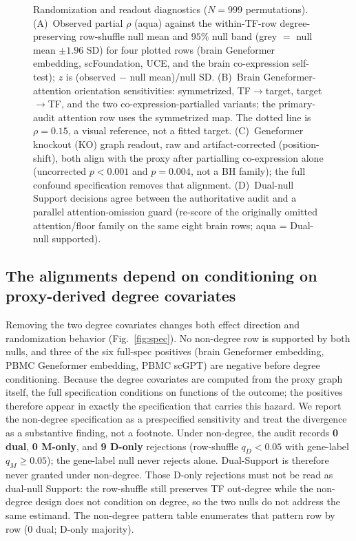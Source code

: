 \documentclass[fleqn,10pt,lineno]{wlpeerj}
\newcommand{\fitfig}[1]{\resizebox{\ifdim\width>\linewidth\linewidth\else\width\fi}{!}{#1}}
\begin{document}
\begin{figure}[!tbp]\centering
\fitfig{}
\caption{Randomization and readout diagnostics ($N=999$ permutations). (A)~Observed partial
$\rho$ (aqua) against the within-TF-row degree-preserving row-shuffle null mean and $95\%$ null
band (grey $=$ null mean $\pm 1.96$ SD) for four plotted rows (brain Geneformer embedding,
scFoundation, UCE, and the brain co-expression self-test); $z$ is (observed $-$ null mean)/null SD.
(B)~Brain Geneformer-attention orientation sensitivities: symmetrized, TF$\to$target,
target$\to$TF, and the two co-expression-partialled variants; the primary-audit attention row uses
the symmetrized map. The dotted line is $\rho=0.15$, a visual reference, not a fitted target.
(C)~Geneformer knockout (KO) graph readout, raw and artifact-corrected (position-shift), both
align with the proxy after partialling co-expression alone (uncorrected $p<0.001$ and $p=0.004$,
not a BH family); the full confound specification removes that alignment. (D)~Dual-null Support decisions agree between the
authoritative audit and a parallel attention-omission guard (re-score of the originally omitted
attention/floor family on the same eight brain rows; aqua = Dual-null supported).}\label{fig:nulls}
\end{figure}

\subsection{The alignments depend on conditioning on proxy-derived degree covariates}
Removing the two degree covariates changes both effect direction and randomization behavior
(Fig.~\ref{fig:spec}). No non-degree row is supported by both nulls, and three of the six
full-spec positives (brain Geneformer embedding, PBMC Geneformer embedding, PBMC scGPT) are
negative before degree conditioning. Because the degree covariates are computed from the proxy
graph itself, the full specification conditions on functions of the outcome; the positives
therefore appear in exactly the specification that carries this hazard. We report the non-degree
specification as a prespecified sensitivity and treat the divergence as a substantive finding, not a footnote.
Under non-degree, the audit records \textbf{0 dual}, \textbf{0 M-only}, and \textbf{9 D-only}
rejections (row-shuffle $q_D<0.05$ with gene-label $q_M\ge0.05$); the gene-label null never
rejects alone. Dual-Support is therefore never granted under non-degree. Those D-only rejections
must not be read as dual-null Support: the row-shuffle still preserves TF out-degree while the
non-degree design does not condition on degree, so the two nulls do not address the same estimand.
The non-degree pattern table enumerates that pattern row by row (0 dual; D-only majority).
\end{document}
